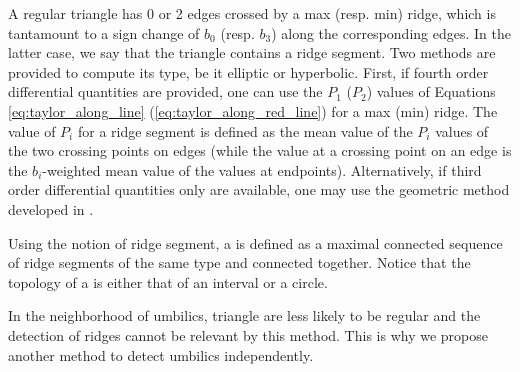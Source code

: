 A regular triangle has 0 or 2 edges crossed by a max (resp. min)
ridge, which is tantamount to a sign change of $b_0$ (resp. $b_3$)
along the corresponding edges. In the latter case, we say that the
triangle contains a ridge segment.
Two methods are provided to compute its type, be it elliptic or
hyperbolic. First, if fourth order differential quantities are
provided, one can use the $P_1$ ($P_2$) values of Equations
\ref{eq:taylor_along_line} (\ref{eq:taylor_along_red_line}) for a
max (min) ridge. The value of $P_i$ for a ridge segment is defined as
the mean value of the $P_i$ values of the two crossing points on edges
(while the value at a crossing point on an edge is the $b_i$-weighted
mean value of the values at endpoints).
Alternatively, if third order differential quantities only are
available, one may use the geometric method developed in
\cite{cgal:cp-tdare-05}.


Using the notion of ridge segment, a  is defined as a
maximal connected sequence of ridge segments of the same type and connected
together.  Notice that the topology of a  is either
that of an interval or a circle.

  In the neighborhood of umbilics,
triangle are less likely to be regular and the detection of ridges
cannot be relevant by this method.  This is why we propose another
method to detect umbilics independently.

